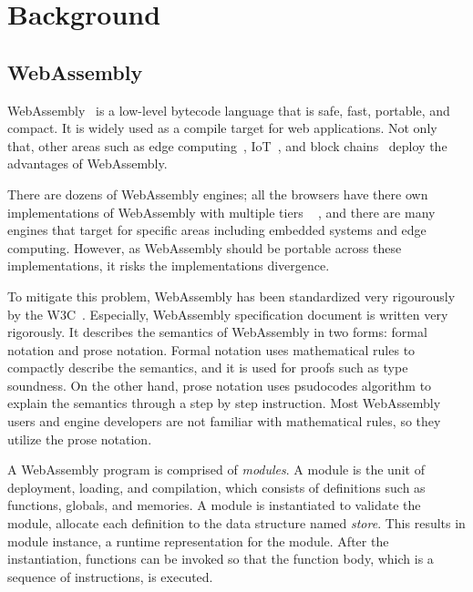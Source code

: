 
\chapter{Background}
\label{ch:background}
\noindent



\section{WebAssembly}
\label{sec:webassembly}


WebAssembly~\cite{wasm} is a low-level bytecode language that is safe, fast,
portable, and compact.
It is widely used as a compile target for web applications.
Not only that, other areas such as edge computing~\cite{wasm-edge},
IoT~\cite{wasm-iot}, and block chains~\cite{wasm-block} deploy the advantages
of WebAssembly.


There are dozens of WebAssembly engines; all the browsers have there own
implementations of WebAssembly with multiple tiers ~\cite{v8}
\cite{spidermonkey} \cite{webkit}, and there are many engines that target for
specific areas including embedded systems and edge computing.
However, as WebAssembly should be portable across these implementations, it risks
the implementations divergence.


To mitigate this problem, WebAssembly has been standardized very rigourously by
the W3C~\cite{wasm-w3c}.
Especially, WebAssembly specification document is written very rigorously.
It describes the semantics of WebAssembly in two forms: formal notation and
prose notation.
Formal notation uses mathematical rules to compactly describe the semantics,
and it is used for proofs such as type soundness.
On the other hand, prose notation uses psudocodes algorithm to explain the
semantics through a step by step instruction.
Most WebAssembly users and engine developers are not familiar with
mathematical rules, so they utilize the prose notation.


A WebAssembly program is comprised of \textit{modules}.
A module is the unit of deployment, loading, and compilation, which consists of
definitions such as functions, globals, and memories.
A module is instantiated to validate the module, allocate each definition to
the data structure named \textit{store}.
This results in module instance, a runtime representation for the module.
After the instantiation, functions can be invoked so that the function body,
which is a sequence of instructions, is executed.

